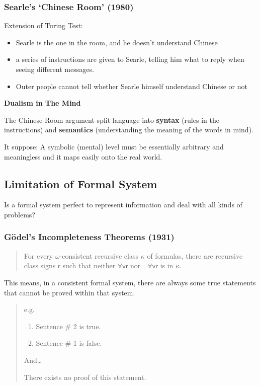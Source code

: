 \documentclass[a4paper, openany]{book}
\begin{document}
\subsubsection{Searle's `Chinese Room' (1980)}

Extension of Turing Test:

\begin{itemize}
  \item Searle is the one in the room, and he doesn't understand Chinese
  \item a series of instructions are given to Searle, telling him what to reply when seeing different messages.
  \item Outer people cannot tell whether Searle himself understand  Chinese or not
\end{itemize}

\textbf{Dualism in The Mind}

The Chinese Room argument split language into \textbf{syntax} (rules in the instructions) and \textbf{semantics} (understanding the meaning of the words in mind).

It suppose: A symbolic (mental) level must be essentially arbitrary and meaningless and it maps easily onto the real world.

\subsection{Limitation of Formal System}

Is a formal system perfect to represent information and deal with all kinds of problems?

\subsubsection{Gödel's Incompleteness Theorems (1931)}

\begin{quotation}
  For every $\omega$-consistent recursive class $\kappa$ of formulas, there are recursive class signs $\mathsf{r}$ such that neither $\forall \mathsf{vr}$ nor $\neg \forall \mathsf{vr}$ is in $\kappa$.
\end{quotation}

This means, in a consistent formal system, there are always some true statements that cannot be proved within that system. 

\begin{quotation}
  e.g.
  \begin{enumerate}
    \item Sentence \# 2 is true.
    \item Sentence \# 1 is false.
  \end{enumerate}

  And\dots

  There exists no proof of this statement.
\end{quotation}
\end{document}
